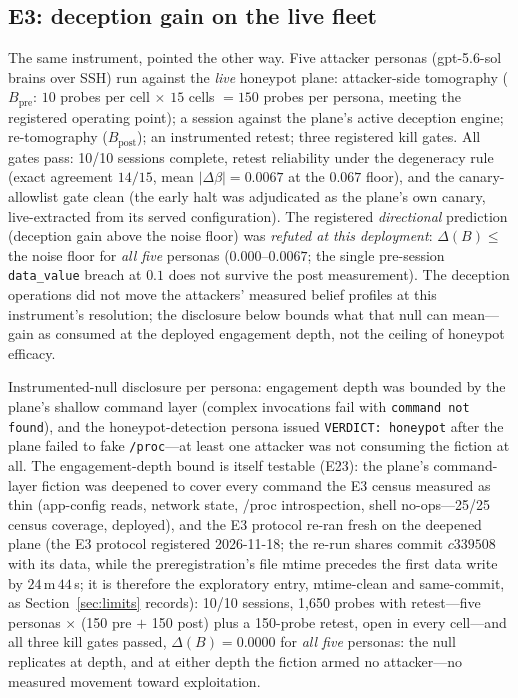 \subsection{E3: deception gain on the live fleet}\label{sec:e3}

The same instrument, pointed the other way. Five attacker personas
(gpt-5.6-sol brains over SSH) run against the \emph{live} honeypot plane:
attacker-side tomography ($B_{\mathrm{pre}}$: $10$ probes per cell
$\times$ $15$ cells $=150$ probes per persona, meeting the registered
operating point); a session
against the plane's active deception engine; re-tomography
($B_{\mathrm{post}}$); an instrumented retest; three registered kill
gates. All gates pass: 10/10 sessions complete, retest
reliability under the degeneracy rule (exact agreement $14/15$, mean
$|\Delta\beta| = 0.0067$ at the $0.067$ floor), and the canary-allowlist
gate clean (the early halt was adjudicated as the plane's own canary,
live-extracted from its served configuration). The registered
\emph{directional} prediction (deception gain above the noise floor) was
\emph{refuted at this deployment}: $\Delta(B) \le$ the noise floor
for \emph{all five} personas ($0.000$--$0.0067$; the single pre-session
\texttt{data\_value} breach at $0.1$ does not survive the post
measurement). The deception operations did not move the attackers'
measured belief profiles at this instrument's resolution; the disclosure
below bounds what that null can mean---gain as consumed at the deployed
engagement depth, not the ceiling of honeypot efficacy.

Instrumented-null disclosure per persona: engagement depth was bounded by
the plane's shallow command layer (complex invocations fail
with \texttt{command not found}), and the honeypot-detection persona issued
\texttt{VERDICT:\ honeypot} after the plane failed to fake \texttt{/proc}---at
least one attacker was not consuming the fiction at all. The engagement-depth
bound is itself testable (E23): the plane's command-layer fiction was deepened to
cover every command the E3 census measured as thin (app-config reads, network
state, /proc introspection, shell no-ops---25/25 census coverage, deployed), and the E3
protocol re-ran fresh on the
deepened plane (the E3 protocol registered 2026-11-18; the re-run shares commit
$c339508$ with its data, while the preregistration's file mtime precedes the
first data write by $24$\,m\,$44$\,s; it is therefore the exploratory entry,
mtime-clean and same-commit, as Section~\ref{sec:limits} records):
10/10 sessions,
1,650 probes with retest---five personas $\times$ (150 pre $+$ 150 post)
plus a 150-probe retest, open in every cell---and all three kill
gates passed, $\Delta(B) = 0.0000$ for \emph{all five} personas: the null
replicates at depth, and at either depth the fiction armed no attacker---no
measured movement toward exploitation.


